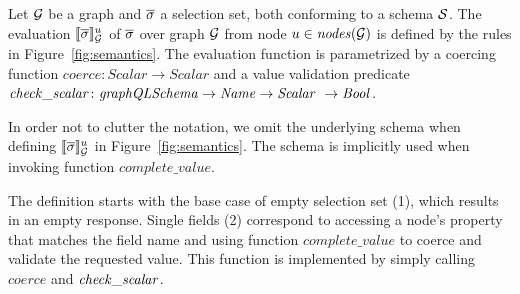 

\begin{definition}
  Let $\mathcal{G}$ be a graph and $\overline{\sigma}$ a selection set, both conforming
  to a schema $\mathcal{S}$. The evaluation $\llbracket \overline{\sigma}
  \rrbracket^{u}_{\mathcal{G}}$ of $\overline{\sigma}$ over graph $\mathcal{G}$
  from node $u \in \mathit{nodes}(\mathcal{G})$ %
  is defined by the rules in Figure~\ref{fig:semantics}. The evaluation function is parametrized by a coercing function
  $\mathit{coerce} \colon \mathit{Scalar} \to \mathit{Scalar}$ and a
  value validation predicate
  $\mathit{check\_scalar} \colon \mathit{graphQLSchema} \to \mathit{Name}
  \to \mathit{Scalar} \ \to \mathit{Bool}$. %
\end{definition}

In order not to clutter the notation, we omit the underlying schema
when defining $\llbracket \overline{\sigma} \rrbracket^{u}_{\mathcal{G}}$ in
Figure~\ref{fig:semantics}. The schema is implicitly used \eg when
invoking function $\mathit{complete\_value}$.

The definition starts with the base case of empty selection set (1),
which results in an empty response.  Single fields (2) correspond to
accessing a node's property that matches the field name and using
function $\mathit{complete\_value}$ to coerce and validate the
requested value. This function is implemented by simply calling
$\mathit{coerce}$ and $\mathit{check\_scalar}$.

